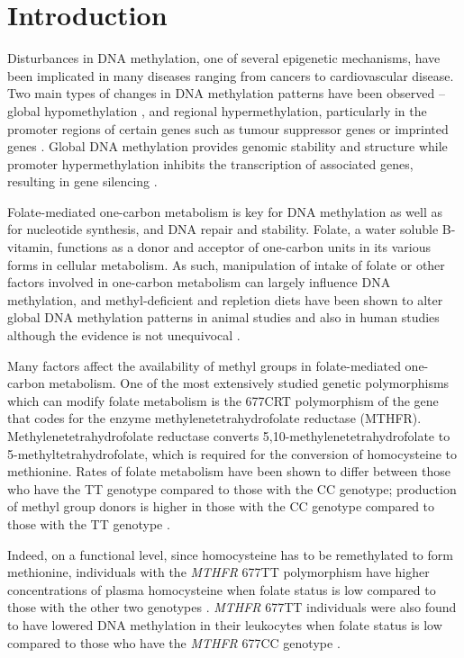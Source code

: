 \newpage

\section{Introduction} %
\noindent Disturbances in DNA methylation, one of several epigenetic mechanisms, have been implicated in many diseases ranging from cancers to cardiovascular disease. Two main types of changes in DNA methylation patterns have been observed -- global hypomethylation \cite{c41}, and regional hypermethylation, particularly in the promoter regions of certain genes such as tumour suppressor genes or imprinted genes \cite{c42,c44}. Global DNA methylation provides genomic stability and structure \cite{c45} while promoter hypermethylation inhibits the transcription of associated genes, resulting in gene silencing \cite{c46}.

\noindent Folate-mediated one-carbon metabolism is key for DNA methylation as well as for nucleotide synthesis, and DNA repair and stability. Folate, a water soluble B-vitamin, functions as a donor and acceptor of one-carbon units in its various forms in cellular metabolism. As such, manipulation of intake of folate or other factors involved in one-carbon metabolism can largely influence DNA methylation, and methyl-deficient and repletion diets have been shown to alter global DNA methylation patterns in animal studies \cite{c47} and also in human studies \cite{c48,c49} although the evidence is not unequivocal \cite{c410,c411}.

\noindent Many factors affect the availability of methyl groups in folate-mediated one-carbon metabolism. One of the most extensively studied genetic polymorphisms which can modify folate metabolism is the 677CRT polymorphism of the gene that codes for the enzyme methylenetetrahydrofolate reductase (MTHFR). Methylenetetrahydrofolate reductase converts 5,10-methylenetetrahydrofolate to 5-methyltetrahydrofolate, which is required for the conversion of homocysteine to methionine. Rates of folate metabolism have been shown to differ between those who have the TT genotype compared to those with the CC genotype; production of methyl group donors is higher in those with the CC genotype compared to those with the TT genotype \cite{c412}.

\noindent Indeed, on a functional level, since homocysteine has to be remethylated to form methionine, individuals with the \emph{MTHFR} 677TT polymorphism have higher concentrations of plasma homocysteine when folate status is low compared to those with the other two genotypes \cite{c413,c414}. \emph{MTHFR} 677TT individuals were also found to have lowered DNA methylation in their leukocytes when folate status is low compared to those who have the \emph{MTHFR} 677CC genotype \cite{c415}.

